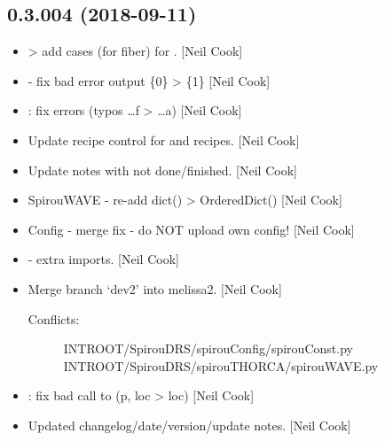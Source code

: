 \documentclass[a4paper,10pt,english]{report}
\begin{document}
\subsection{0.3.004 (2018-09-11)}
\label{\detokenize{misc/changelog:id330}}\begin{itemize}
\item {} 
 \textendash{}\textgreater{} add cases (for fiber) for .
{[}Neil Cook{]}

\item {} 
 - fix bad error output \{0\} \textendash{}\textgreater{} \{1\} {[}Neil Cook{]}

\item {} 
: fix errors (typos …f \textendash{}\textgreater{} …a) {[}Neil Cook{]}

\item {} 
Update recipe control for  and  recipes. {[}Neil Cook{]}

\item {} 
Update notes with not done/finished. {[}Neil Cook{]}

\item {} 
SpirouWAVE - re-add dict() \textendash{}\textgreater{} OrderedDict() {[}Neil Cook{]}

\item {} 
Config - merge fix - do NOT upload own config! {[}Neil Cook{]}

\item {} 
 - extra imports. {[}Neil Cook{]}

\item {} 
Merge branch ‘dev2’ into melissa2. {[}Neil Cook{]}
\begin{description}
\item[{Conflicts:}] \leavevmode
{}
INTROOT/SpirouDRS/spirouConfig/spirouConst.py
INTROOT/SpirouDRS/spirouTHORCA/spirouWAVE.py

\end{description}

\item {} 
: fix bad call to  (p, loc \textendash{}\textgreater{} loc)
{[}Neil Cook{]}

\item {} 
Updated changelog/date/version/update notes. {[}Neil Cook{]}


\end{itemize}
\end{document}
